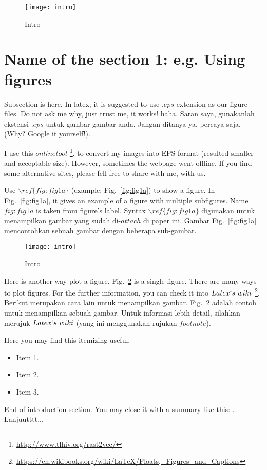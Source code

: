 \begin{figure}[H]
\centering
\texttt{[image: intro]}
\caption{Intro}
\label{fig:fig1b}
\end{figure}

\section{Name of the section 1: e.g. Using figures}
Subsection is here. In latex, it is suggested to use $.eps$ extension as our figure files. Do not ask me why, just trust me, it works! haha. Saran saya, gunakanlah ekstensi $.eps$ untuk gambar-gambar anda. Jangan ditanya ya, percaya saja. (Why? Google it yourself!). 

I use this $online tool$ \footnote{\label{note:eps_converter1}\url{http://www.tlhiv.org/rast2vec/}}. to convert my images into EPS format (resulted smaller and acceptable size). However, sometimes the webpage went offline. If you find some alternative sites, please fell free to share with me, with us.

Use $\backslash ref\{fig:fig1a\}$ (example: Fig.~\ref{fig:fig1a}) to show a figure. In Fig.~\ref{fig:fig1a}, it gives an example of a figure with multiple subfigures. Name $fig:fig1a$ is taken from figure's label. Syntax $\backslash ref\{fig:fig1a\}$ digunakan untuk menampilkan gambar yang sudah di-$attach$ di paper ini. Gambar Fig.~\ref{fig:fig1a} mencontohkan sebuah gambar dengan beberapa sub-gambar.

\begin{figure}[H]
\centering
\texttt{[image: intro]}
\caption{Intro}
\label{fig:fig2}
\end{figure}

Here is another way plot a figure. Fig.~\ref{fig:fig2} is a single figure. There are many ways to plot figures. For the further information, you can check it into $Latex \lq s~wiki$ \footnote{\label{note:latex_wiki_figures}\url{https://en.wikibooks.org/wiki/LaTeX/Floats,_Figures_and_Captions}}. Berikut merupakan cara lain untuk menampilkan gambar. Fig.~\ref{fig:fig2} adalah contoh untuk menampilkan sebuah gambar. Untuk informasi lebih detail, silahkan merujuk $Latex \lq s~wiki$ \footnotemark[\ref{note:latex_wiki_figures}] (yang ini menggunakan rujukan $footnote$). 

Here you may find this itemizing useful.
\begin{itemize}
  \item Item 1.
  \item Item 2.
  \item Item 3.
\end{itemize}

End of introduction section. You may close it with a summary like this: . Lanjuutttt...



